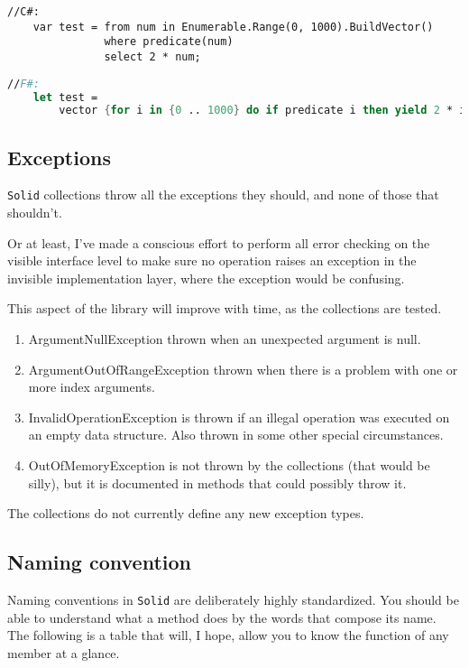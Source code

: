 \documentclass[]{article}
\newcommand{\solid}{\texttt{Solid}\xspace}
\begin{document}
\begin{lstlisting}[frame=t]
	//C#:
	var test = from num in Enumerable.Range(0, 1000).BuildVector()
			   where predicate(num)
			   select 2 * num;
\end{lstlisting}
\begin{lstlisting}[language=fsharp,frame=b]
	//F#:
	let test = 
		vector {for i in {0 .. 1000} do if predicate i then yield 2 * i }
\end{lstlisting}



\subsection{Exceptions}\label{sec:exceptions}
		\solid collections throw all the exceptions they should, and none of those that shouldn't. 

Or at least, I've made a conscious effort to perform all error checking on the visible interface level to make sure no operation raises an exception in the invisible implementation layer, where the exception would be confusing. 

This aspect of the library will improve with time, as the collections are tested.

\begin{enumerate}
	\item ArgumentNullException thrown when an unexpected argument is null.
	\item ArgumentOutOfRangeException thrown when there is a problem with one or more index arguments.
	\item InvalidOperationException is thrown if an illegal operation was executed on an empty data structure. Also thrown in some other special circumstances.
	\item OutOfMemoryException is not thrown by the collections (that would be silly), but it is documented in methods that could possibly throw it.
\end{enumerate}

The collections do not currently define any new exception types.

\subsection{Naming convention}
Naming conventions in \solid are deliberately highly standardized. You should be able to understand what a method does by the words that compose its name. The following is a table that will, I hope, allow you to know the function of any member at a glance.
\end{document}
